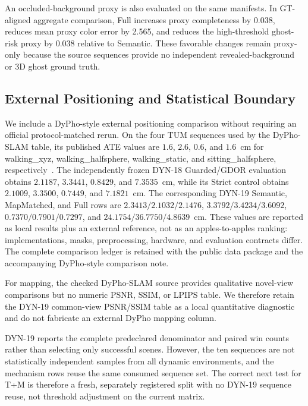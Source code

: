 An occluded-background proxy is also evaluated on the same manifests.
In GT-aligned aggregate comparison, Full increases proxy completeness by 0.038, reduces mean proxy color error by 2.565, and reduces the high-threshold ghost-risk proxy by 0.038 relative to Semantic.
These favorable changes remain proxy-only because the source sequences provide no independent revealed-background or 3D ghost ground truth.

\subsection{External Positioning and Statistical Boundary}

We include a DyPho-style external positioning comparison without requiring an official protocol-matched rerun.
On the four TUM sequences used by the DyPho-SLAM table, its published ATE values are $1.6$, $2.6$, $0.6$, and $1.6$~cm for walking\_xyz, walking\_halfsphere, walking\_static, and sitting\_halfsphere, respectively~\cite{liu2025dyphoslam}.
The independently frozen DYN-18 Guarded/GDOR evaluation obtains $2.1187$, $3.3441$, $0.8429$, and $7.3535$~cm, while its Strict control obtains $2.1009$, $3.3500$, $0.7449$, and $7.1821$~cm.
The corresponding DYN-19 Semantic, MapMatched, and Full rows are $2.3413/2.1032/2.1476$, $3.3792/3.4234/3.6092$, $0.7370/0.7901/0.7297$, and $24.1754/36.7750/4.8639$~cm.
These values are reported as local results plus an external reference, not as an apples-to-apples ranking: implementations, masks, preprocessing, hardware, and evaluation contracts differ.
The complete comparison ledger is retained with the public data package and the accompanying DyPho-style comparison note.

For mapping, the checked DyPho-SLAM source provides qualitative novel-view comparisons but no numeric PSNR, SSIM, or LPIPS table.
We therefore retain the DYN-19 common-view PSNR/SSIM table as a local quantitative diagnostic and do not fabricate an external DyPho mapping column.

DYN-19 reports the complete predeclared denominator and paired win counts rather than selecting only successful scenes.
However, the ten sequences are not statistically independent samples from all dynamic environments, and the mechanism rows reuse the same consumed sequence set.
The correct next test for T+M is therefore a fresh, separately registered split with no DYN-19 sequence reuse, not threshold adjustment on the current matrix.

